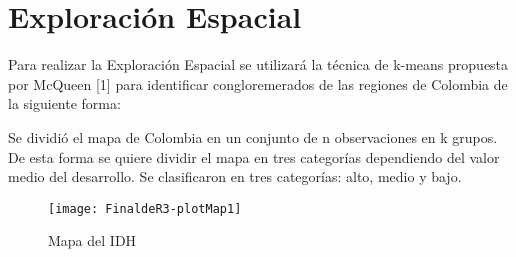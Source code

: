 \documentclass{article}
\begin{document}
\clearpage

\section{Exploraci\'on Espacial}

Para realizar la Exploraci\'on Espacial se utilizar\'a la t\'ecnica de k-means propuesta por McQueen [1] para identificar congloremerados de las regiones de Colombia de la siguiente forma:

Se dividi\'o el mapa de Colombia en un conjunto de n observaciones en k grupos. De esta forma se quiere dividir el mapa en tres categor\'ias dependiendo del valor medio del desarrollo. Se clasificaron en tres categor\'ias: alto, medio y bajo.







\begin{figure}[h]
\centering

\texttt{[image: FinaldeR3-plotMap1]}

\caption{Mapa del IDH}
\label{map}
\end{figure}


\renewcommand{\refname}{Bibliograf\'ia}

\end{document}
